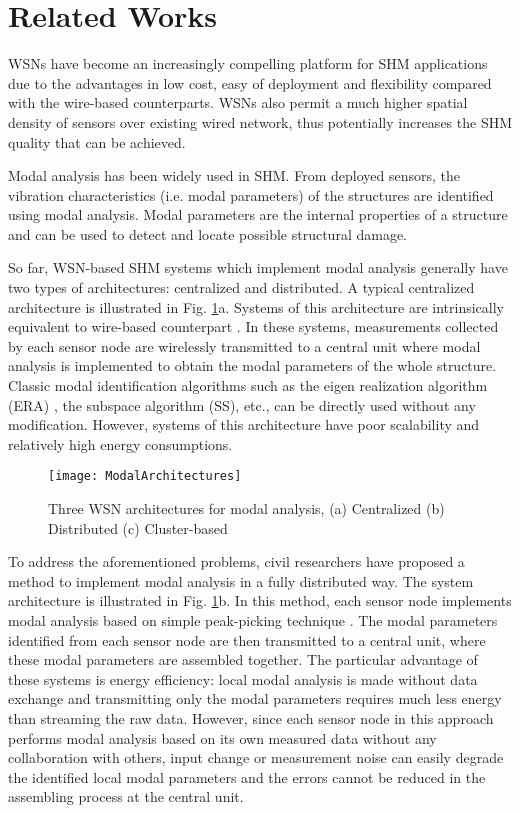 \section{Related Works}
\label{sec:relatedworks}
WSNs have become an increasingly compelling platform for SHM applications due to the advantages in low cost, easy of deployment and flexibility compared with the wire-based counterparts\cite{jeongyeup2005embedded}. WSNs also permit a much higher spatial density of sensors over existing wired network, thus potentially increases the SHM quality that can be achieved.

Modal analysis has been widely used in SHM. From deployed sensors, the vibration characteristics (i.e. modal parameters) of the structures are identified using modal analysis.  Modal parameters are the internal properties of a structure and can be used to detect and locate possible structural damage. 

So far, WSN-based SHM systems which implement modal analysis generally have two types of architectures: centralized and distributed.  A typical centralized architecture is illustrated in Fig. \ref{fig:ModalArchitectures}a.  Systems of this architecture are intrinsically equivalent to wire-based counterpart \cite{kim2007health}. In these systems, measurements collected by each sensor node are wirelessly transmitted to a central unit where modal analysis is implemented to obtain the modal parameters of the whole structure. Classic modal identification algorithms such as the eigen realization algorithm (ERA) \cite{juang1985eigensystem}, the subspace algorithm (SS)\cite{ljung1987system}, etc., can be directly used without any modification. However, systems of this architecture have poor scalability and relatively high energy consumptions. 

\begin{figure}
\centering
\texttt{[image: ModalArchitectures]}%
\caption{Three WSN architectures for modal analysis, (a) Centralized (b) Distributed (c) Cluster-based}
\label{fig:ModalArchitectures}
\end{figure}
To address the aforementioned problems, civil researchers have proposed a method to implement modal analysis in a fully distributed way. The system architecture is illustrated in Fig. \ref{fig:ModalArchitectures}b. In this method, each sensor node implements modal analysis based on simple peak-picking technique \cite{ewins1984modal}. The modal parameters identified from each sensor node are then transmitted to a central unit, where these modal parameters are assembled together.  The particular advantage of these systems is energy efficiency: local modal analysis is made without data exchange and transmitting only the modal parameters requires much less energy than streaming the raw data. However, since each sensor node in this approach performs modal analysis based on its own measured data without any collaboration with others, input change or measurement noise can easily degrade the identified local modal parameters and the errors cannot be reduced in the assembling process at the central unit.

